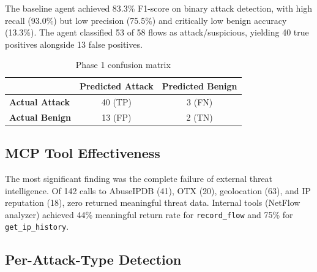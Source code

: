 \documentclass[12pt, a4paper, oneside]{report}
\begin{document}
The baseline agent achieved 83.3\% F1-score on binary attack detection, with
high recall (93.0\%) but low precision (75.5\%) and critically low benign
accuracy (13.3\%). The agent classified 53 of 58 flows as attack/suspicious,
yielding 40 true positives alongside 13 false positives.

\begin{table}[H]
\centering
\caption{Phase 1 confusion matrix}
\label{tab:phase1-cm}
\begin{tabular}{@{}lcc@{}}
\toprule
& \textbf{Predicted Attack} & \textbf{Predicted Benign} \\
\midrule
\textbf{Actual Attack} & 40 (TP) & 3 (FN) \\
\textbf{Actual Benign} & 13 (FP) & 2 (TN) \\
\bottomrule
\end{tabular}
\end{table}

\subsection{MCP Tool Effectiveness}

The most significant finding was the complete failure of external threat
intelligence. Of 142 calls to AbuseIPDB (41), OTX (20), geolocation (63),
and IP reputation (18), zero returned meaningful threat data. Internal tools
(NetFlow analyzer) achieved 44\% meaningful return rate for \texttt{record\_flow}
and 75\% for \texttt{get\_ip\_history}.

\subsection{Per-Attack-Type Detection}
\end{document}
